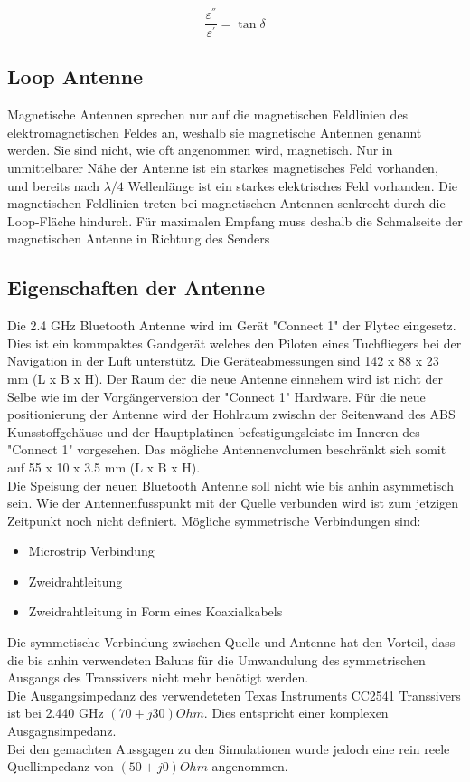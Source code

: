 \begin{equation} \label{eq:VerlustwinkelEpsilonPermitivität}
\dfrac{\varepsilon^{''}}{\varepsilon^{'}}=\tan\delta
\end{equation}

\subsection{Loop Antenne}
Magnetische Antennen sprechen nur auf die magnetischen Feldlinien des elektromagnetischen Feldes an, weshalb sie magnetische Antennen genannt werden. Sie sind nicht, wie oft angenommen wird, magnetisch. Nur in unmittelbarer Nähe der Antenne ist ein starkes magnetisches Feld vorhanden, und bereits nach $\lambda/4$ Wellenlänge ist ein starkes elektrisches Feld vorhanden. Die magnetischen Feldlinien treten bei magnetischen Antennen senkrecht durch die Loop-Fläche hindurch. Für maximalen Empfang muss deshalb die Schmalseite der magnetischen Antenne in Richtung des Senders

\subsection{Eigenschaften der Antenne}\label{sec:EigenschaftenAntenne}
Die 2.4 GHz Bluetooth Antenne wird im Gerät "Connect 1" der Flytec eingesetz. Dies ist ein kommpaktes Gandgerät welches den Piloten eines Tuchfliegers bei der Navigation in der Luft unterstütz. Die Geräteabmessungen sind 142 x 88 x 23 mm (L x B x H). Der Raum der die neue Antenne einnehem wird ist nicht der Selbe wie im der Vorgängerversion der "Connect 1" Hardware. Für die neue positionierung der Antenne wird der Hohlraum zwischn der Seitenwand des ABS Kunsstoffgehäuse und der Hauptplatinen befestigungsleiste im Inneren des "Connect 1" vorgesehen. Das mögliche Antennenvolumen beschränkt sich somit auf 55 x 10 x 3.5 mm (L x B x H).\\
Die Speisung der neuen Bluetooth Antenne soll nicht wie bis anhin asymmetisch sein. Wie der Antennenfusspunkt mit der Quelle verbunden wird ist zum jetzigen Zeitpunkt noch nicht definiert. Mögliche symmetrische Verbindungen sind:
\begin{itemize}
\item Microstrip Verbindung  
\item Zweidrahtleitung
\item Zweidrahtleitung in Form eines Koaxialkabels
\end{itemize}

Die symmetische Verbindung zwischen Quelle und Antenne hat den Vorteil, dass die bis anhin verwendeten Baluns für die Umwandulung des symmetrischen Ausgangs des Transsivers nicht mehr benötigt werden. \\
Die Ausgangsimpedanz des verwendeteten Texas Instruments CC2541 Transsivers ist bei 2.440 GHz $(70+j30) Ohm$. Dies entspricht einer komplexen Ausgagnsimpedanz. \\Bei den gemachten Aussgagen zu den Simulationen wurde jedoch eine rein reele Quellimpedanz von $(50+j0) Ohm$ angenommen.

